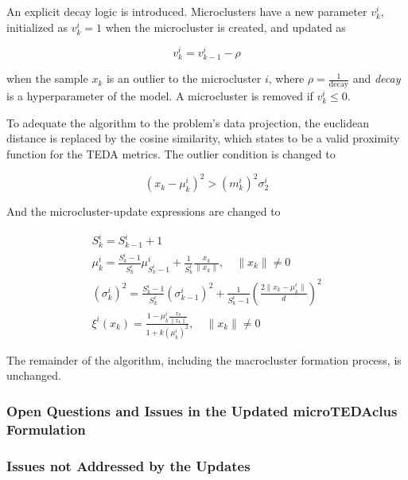\documentclass[a4paper]{article}
\begin{document}
An explicit decay logic is introduced. Microclusters have a new parameter $v^i_k$, initialized as $v^i_k = 1$ when the microcluster is created, and updated as

\begin{equation}
    v^i_k = v^i_{k-1} - \rho
\end{equation}

when the sample $x_k$ is an outlier to the microcluster $i$, where $\rho = \frac{1}{\text{decay}}$ and \textit{decay} is a hyperparameter of the model. A microcluster is removed if $v^i_k \le 0$.

To adequate the algorithm to the problem's data projection, the euclidean distance is replaced by the cosine similarity, which \cite{angelov2014outside} states to be a valid proximity function for the TEDA metrics. The outlier condition is changed to

\begin{equation}
    \left(x_k - \mu^i_k\right)^2 > \left(m^i_k\right)^2\sigma^i_2 \label{critique:imports_euclidean_condition_from_angelov}
\end{equation}

And the microcluster-update expressions are changed to

\begin{equation}
\begin{gathered}
    S^i_k = S^i_{k-1} + 1 \\
    \mu^i_k = \frac{S^i_k - 1}{S^i_k} \mu^i_{S^i_{k}-1} + \frac{1}{S^i_k} \frac{x_k}{\lVert x_k \rVert}, \quad \lVert x_k \rVert \neq 0 \\
    \left(\sigma^i_k\right)^2 = \frac{S^i_k - 1}{S^i_k} \left(\sigma^i_{k-1}\right)^2 + \frac{1}{S^i_k - 1} \left( \frac{2\lVert x_k - \mu^i_k \rVert}{d} \right)^2 \label{critique:euclidean_variance} \\
    \xi^i(x_k) = \frac{1 - \mu^i_k\frac{x_k}{\lVert x_k \rVert}}{1 + k\left(\mu^i_k\right)^2}, \quad \lVert x_k \rVert \neq 0
\end{gathered}
\end{equation}

The remainder of the algorithm, including the macrocluster formation process, is unchanged.

\subsubsection{Open Questions and Issues in the Updated microTEDAclus Formulation}

\subsubsection{Issues not Addressed by the Updates}
\end{document}
